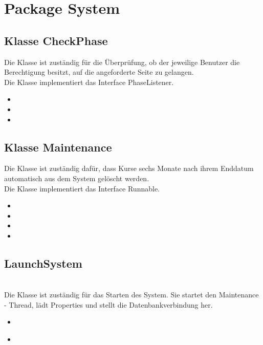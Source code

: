 	\section{Package System}
	
	\subsection{Klasse CheckPhase}
	Die Klasse ist zuständig für die Überprüfung, ob der jeweilige Benutzer die Berechtigung besitzt, auf die angeforderte Seite zu gelangen.\\
	Die Klasse implementiert das Interface PhaseListener.
	\begin{itemize}
		\item {}
		\item \override
		\item \override
	\end{itemize}
	
	\subsection{Klasse Maintenance}
	Die Klasse ist zuständig dafür, dass Kurse sechs Monate nach ihrem Enddatum automatisch aus dem System gelöscht werden.\\
	Die Klasse implementiert das Interface Runnable.
	\begin{itemize}
		\item {}
		\item {}
		\item {}
		\item \override
	\end{itemize}
	
	\subsection{LaunchSystem}
	\\
	Die Klasse ist zuständig für das Starten des System. Sie startet den Maintenance - Thread, lädt Properties und stellt die Datenbankverbindung her.
	\begin{itemize}
		\item {}\\
		\item {}\\
	\end{itemize}
	
